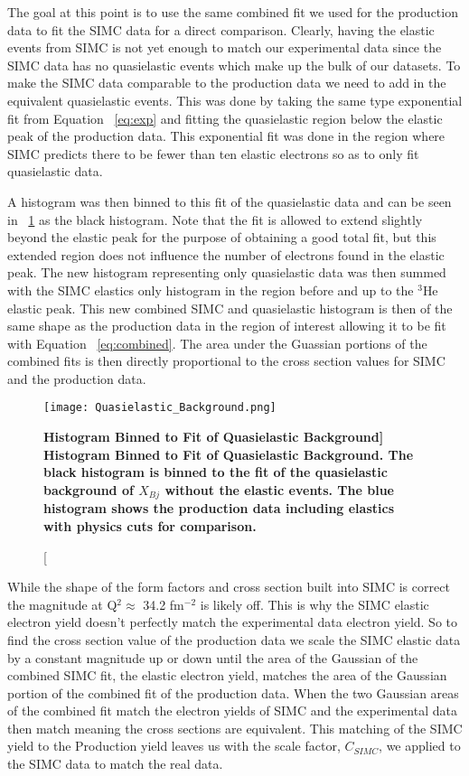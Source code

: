 The goal at this point is to use the same combined fit we used for the production data to fit the SIMC data for a direct comparison. Clearly, having the elastic events from SIMC is not yet enough to match our experimental data since the SIMC data has no quasielastic events which make up the bulk of our datasets. To make the SIMC data comparable to the production data we need to add in the equivalent quasielastic events. This was done by taking the same type exponential fit from Equation ~\ref{eq:exp} and fitting the quasielastic region below the elastic peak of the production data. This exponential fit was done in the region where SIMC predicts there to be fewer than ten elastic electrons so as to only fit quasielastic data. 

A histogram was then binned to this fit of the quasielastic data and can be seen in ~\ref{fig:QE_background} as the black histogram. Note that the fit is allowed to extend slightly beyond the elastic peak for the purpose of obtaining a good total fit, but this extended region does not influence the number of electrons found in the elastic peak. The new histogram representing only quasielastic data was then summed with the SIMC elastics only histogram in the region before and up to the $^3$He elastic peak. This new combined SIMC and quasielastic histogram is then of the same shape as the production data in the region of interest allowing it to be fit with Equation ~\ref{eq:combined}. The area under the Guassian portions of the combined fits is then directly proportional to the cross section values for SIMC and the production data. 

\begin{figure}[!ht]
\begin{center}
\texttt{[image: Quasielastic\_Background.png]}
\end{center}
\caption[\bf{Histogram Binned to Fit of Quasielastic Background}]{
{\bf{Histogram Binned to Fit of Quasielastic Background.}} The black histogram is binned to the fit of the quasielastic background of $X_{Bj}$ without the elastic events. The blue histogram shows the production data including elastics with physics cuts for comparison.}
\label{fig:QE_background}
\end{figure}

While the shape of the form factors and cross section built into SIMC is correct the magnitude at Q$^2 \approx$ 34.2 fm$^{-2}$ is likely off. This is why the SIMC elastic electron yield doesn't perfectly match the experimental data electron yield. So to find the cross section value of the production data we scale the SIMC elastic data by a constant magnitude up or down until the area of the Gaussian of the combined SIMC fit, the elastic electron yield, matches the area of the Gaussian portion of the combined fit of the production data. When the two Gaussian areas of the combined fit match the electron yields of SIMC and the experimental data then match meaning the cross sections are equivalent. This matching of the SIMC yield to the Production yield leaves us with the scale factor, $C_{SIMC}$, we applied to the SIMC data to match the real data. 

